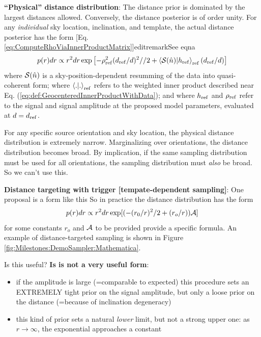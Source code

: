 \documentclass[twocolumn,prd,nofootinbib]{revtex4}
\newcommand\editremark[1]{{\color{red} #1}}
\newcommand\qmstateproduct[2]{\left\langle#1|#2\right\rangle}
\begin{document}
\begin{widetext}
\noindent \textbf{``Physical'' distance distribution}: The distance prior is dominated by the largest distances allowed.  Conversely,
the distance posterior is of order unity.
%
For any \emph{individual} sky location, inclination,  and template, the actual distance posterior has the form [Eq. \ref{eq:ComputeRhoViaInnerProductMatrix}]editremark{See eqna}
\begin{eqnarray}
p(r)dr \propto  r^2 dr \exp \left[ -\rho_{\rm ref}^2 (d_{\rm ref}/d)^2//2 + \qmstateproduct{{\cal S}(\hat{n})}{h_{\rm
      ref}}_{\rm ref} (d_{\rm
    ref}/d) \right]
\end{eqnarray}
where ${\cal S}(\hat{n})$ is a sky-position-dependent resumming of the data into quasi-coherent form; where
$\qmstateproduct{.}{.}_{\rm ref}$ refers to the weighted inner product described near
Eq. (\ref{eq:def:GeocenteredInnerProductWithData}); and where $h_{\rm ref}$ and $\rho_{\rm ref}$ refer to the signal
and signal amplitude at the proposed model parameters, evaluated at $d=d_{\rm ref}$.  
%

For any specific source orientation and sky location, the physical distance distribution is extremely narrow.
Marginalizing over orientations, the distance distribution becomes broad.  By implication, if the
same sampling distribution must be used for all orientations, the sampling distribution must \emph{also} be broad.  So
we can't use this.


\begin{shaded}
\noindent \textbf{Distance targeting with trigger [tempate-dependent sampling]}:  One proposal is a form like this
So in practice the distance distribution has the form
\begin{eqnarray}
p(r)dr \propto r^2 dr \exp[ (-(r_0/r)^2/2 + (r_o/r)){\cal A}]
\end{eqnarray}
for some constants $r_o$ and ${\cal A}$ to be provided \editremark{provide a specific formula}.  An example of distance-targeted sampling is shown in Figure
\ref{fig:Milestones:DemoSampler:Mathematica}.  

Is this useful?  \textbf{Is is not a very useful form}:
\begin{itemize}
\item  if the amplitude is large (=comparable to expected) this procedure sets an EXTREMELY tight prior on the signal amplitude, but
only a loose prior on the distance (=because of inclination degeneracy)

\item this kind of prior sets a natural \emph{lower} limit, but not a strong upper one: as $r \rightarrow \infty$, the
  exponential approaches a constant
\end{itemize}


\end{shaded}
\end{widetext}
\end{document}
